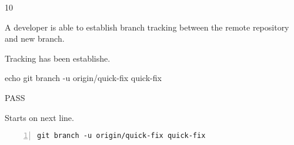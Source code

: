 \begin{description}[align=right,leftmargin=3.2cm,labelindent=3.0cm]
\item[Step:] 10
\item[Confirm:] A developer is able to establish branch tracking between the remote repository and new branch.
\item[Expectation:] Tracking has been establishe.
\item[Command:] echo git  branch -u origin/quick-fix quick-fix
\item[Test Result:] PASS
\item[Evidence:] Starts on next line.
\end{description}
\begin{lstlisting}[numbers=left]
git branch -u origin/quick-fix quick-fix

\end{lstlisting}
